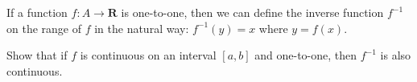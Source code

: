 \begin{exercise}
  If a function $f: A \rightarrow \mathbf{R}$ is one-to-one, then we can define the inverse function $f^{-1}$ on the range of $f$ in the natural way: $f^{-1}(y)=x$ where $y=f(x)$.

  Show that if $f$ is continuous on an interval $[a, b]$ and one-to-one, then $f^{-1}$ is also continuous.
\end{exercise}
\begin{solution}
  \TODO
\end{solution}
